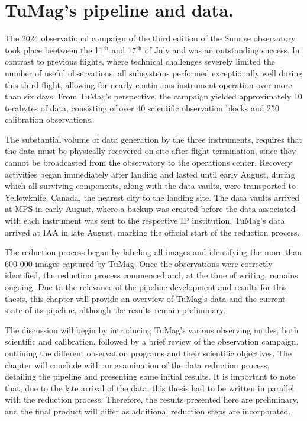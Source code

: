 \chapter{\label{CH:Pipeline}TuMag's pipeline and data.}


The 2024 observational campaign of the third edition of the Sunrise observatory took place beetween the 11$^{\text{th}}$ and 17$^{\text{th}}$ of July and was an outstanding success. In contrast to previous flights, where technical challenges severely limited the number of useful observations, all subsystems performed exceptionally well during this third flight, allowing for nearly continuous instrument operation over more than six days. From TuMag’s perspective, the campaign yielded approximately 10 terabytes of data, consisting of over 40 scientific observation blocks and 250 calibration observations.

The substantial volume of data generation by the three instruments, requires that the data must be physically recovered on-site after flight termination, since they cannot be broadcasted from the observatory to the operations center. Recovery activities began immediately after landing and lasted until early August, during which all surviving components, along with the data vaults, were transported to Yellowknife, Canada, the nearest city to the landing site. The data vaults arrived at MPS in early August, where a backup was created before the data associated with each instrument was sent to the respective IP institution. TuMag’s data arrived at  IAA in late August, marking the official start of the reduction process.

The reduction process began by labeling all images and identifying the more than 600 000 images captured by TuMag. Once the observations were correctly identified, the reduction process commenced and, at the time of writing, remains ongoing. Due to the relevance of the pipeline development and results for this thesis, this chapter will provide an overview of TuMag's data and the current state of its pipeline, although the results remain preliminary.

The discussion will begin by introducing TuMag’s various observing modes, both scientific and calibration, followed by a brief review of the observation campaign, outlining the different observation programs and their scientific objectives. The chapter will conclude with an examination of the data reduction process, detailing the pipeline and presenting some initial results. It is important to note that, due to the late arrival of the data, this thesis had to be written in parallel with the reduction process. Therefore, the results presented here are preliminary, and the final product will differ as additional reduction steps are incorporated.


